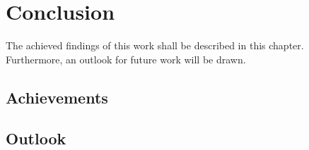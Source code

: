 \chapter{Conclusion}

The achieved findings of this work shall be described in this chapter. Furthermore, an outlook for future work will be drawn.

\section{Achievements}



\section{Outlook}

